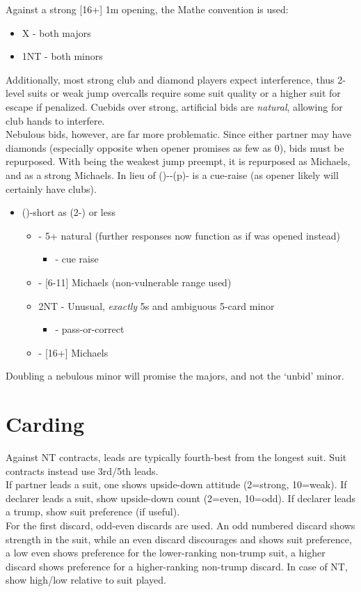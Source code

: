 \documentclass[12pt]{report}
\newcommand{\n}{\\}
\newcommand{\ul}[1]{\begin{itemize}#1\end{itemize}}
\newcommand{\li}{\item[~]}
\begin{document}
    Against a strong [16+] 1m opening, the Mathe convention is used:

    \ul {
        \li X - both majors
        \li 1NT - both minors
    }

    Additionally, most strong club and diamond players expect interference, thus 2-level suits or weak jump overcalls require some suit quality or a higher suit for escape if penalized.  Cuebids over strong, artificial bids are \textit{natural}, allowing for club hands to interfere.\n

    Nebulous bids, however, are far more problematic.  Since either partner may have diamonds (especially opposite when opener promises as few as 0), bids must be repurposed.  With  being the weakest jump preempt, it is repurposed as Michaels, and  as a strong Michaels.  In lieu of ()--(p)- is a cue-raise (as opener likely will certainly have clubs).
    
    \ul {
        \li ()-short as (2-) or less
        \ul {
            \li \di2 - 5+ natural (further responses now function as if \cl1 was opened instead)
            \ul {
                \li \cl3 - cue raise
            }
            \li \he2 - [6-11] Michaels (non-vulnerable range used)
            \li 2NT - Unusual, \textit{exactly} 5\he{}s and ambiguous 5-card minor
            \ul {
                \li \cl3 - pass-or-correct
            }
            \li \di3 - [16+] Michaels
        }
    }

    Doubling a nebulous minor will promise the majors, and not the `unbid' minor.

\chapter{Carding}

    Against NT contracts, leads are typically fourth-best from the longest suit.  Suit contracts instead use 3rd/5th leads. \n

    If partner leads a suit, one shows upside-down attitude (2=strong, 10=weak).  If declarer leads a suit, show upside-down count (2=even, 10=odd).  If declarer leads a trump, show suit preference (if useful). \n

    For the first discard, odd-even discards are used.  An odd numbered discard shows strength in the suit, while an even discard discourages and shows suit preference, a low even shows preference for the lower-ranking non-trump suit, a higher discard shows preference for a higher-ranking non-trump discard.  In case of NT, show high/low relative to suit played.\n
\end{document}
